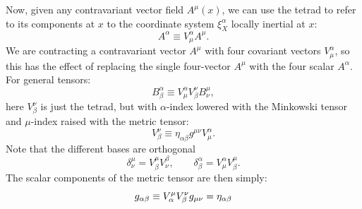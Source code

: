 Now, given any contravariant vector field $A^\mu(x)$, we can use the tetrad to refer to its components at $x$ to the coordinate system $\xi^\alpha_X$ locally inertial at $x$:
\begin{equation}
	A^\alpha \equiv V^\alpha_\mu A^\mu.
\end{equation}
We are contracting a contravariant vector $A^\mu$ with four covariant vectors $V^\alpha_\mu$, so this has the effect of replacing the single four-vector $A^\mu$ with the four scalar $A^\alpha$. For general tensors:
\begin{equation}
	B^\alpha_\beta \equiv V^\alpha_\mu V^\nu_\beta B^\mu_\nu,
\end{equation}
here $V^\nu_\beta$ is just the tetrad, but with $\alpha$-index lowered with the Minkowski tensor and $\mu$-index raised with the metric tensor:
\begin{equation}
	V^\nu_\beta \equiv \eta_{\alpha \beta}g^{\mu \nu} V^\alpha_\mu.
\end{equation}
Note that the different bases are orthogonal
\begin{equation}
	\delta^\mu_\nu = V^\mu_\beta V^\beta_\nu, \qquad \delta^\alpha_\beta=V^\alpha_\mu V^\mu_\beta.
\end{equation}
The scalar components of the metric tensor are then simply:
\begin{equation}
	g_{\alpha \beta} \equiv V^\mu_\alpha V^\nu_\beta g_{\mu \nu} = \eta_{\alpha \beta}
\end{equation}
